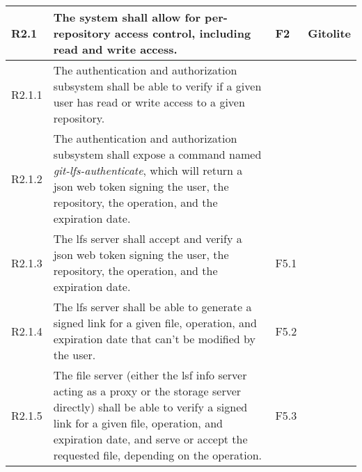 \documentclass[a4paper,11pt]{article}
\begin{document}
\begin{landscape}
\begin{longtable}{|p{1cm}|p{19cm}|p{2cm}|p{3cm}|}
        \rowcolor[HTML]{DDFFDD}        R2.1       & The system shall allow for per-repository access control, including read and write access.                                                                                                                                                                                            & F2                    & Gitolite                                 \\ \hline
        \rowcolor[HTML]{EEFFEE}        R2.1.1     & The authentication and authorization subsystem shall be able to verify if a given user has read or write access to a given repository.                                                                                                                                                &                       &                                          \\ \hline
        \rowcolor[HTML]{EEFFEE}        R2.1.2     & The authentication and authorization subsystem shall expose a command named \textit{git-lfs-authenticate}, which will return a json web token signing the user, the repository, the operation, and the expiration date.                                                               &                       &                                          \\ \hline
        \rowcolor[HTML]{EEFFEE}        R2.1.3     & The lfs server shall accept and verify a json web token signing the user, the repository, the operation, and the expiration date.                                                                                                                                                     & F5.1                  &                                          \\ \hline
        \rowcolor[HTML]{EEFFEE}        R2.1.4     & The lfs server shall be able to generate a signed link for a given file, operation, and expiration date that can't be modified by the user.                                                                                                                                           & F5.2                  &                                          \\ \hline
        \rowcolor[HTML]{EEFFEE}        R2.1.5     & The file server (either the lsf info server acting as a proxy or the storage server directly) shall be able to verify a signed link for a given file, operation, and expiration date, and serve or accept the requested file, depending on the operation.                             & F5.3                  &                                          \\ \hline

\end{longtable}
\end{landscape}
\end{document}
